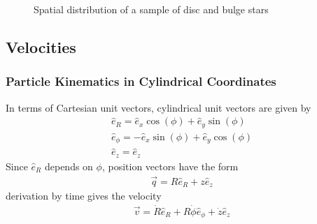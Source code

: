 \documentclass[letterpaper,10pt,english]{sphinxmanual}
\begin{document}
				\begin{figure}[htbp]
				\centering
				\capstart
				
				\noindent{}
				\caption{Spatial distribution of a sample of disc and bulge stars}\label{\detokenize{NBodySimulation/Initialization:id45}}\label{\detokenize{NBodySimulation/Initialization:fig-initial-conditions-positions}}\end{figure}
			
			
			\subsection{Velocities}
				\label{\detokenize{NBodySimulation/Initialization:velocities}}
				
				\subsubsection{Particle Kinematics in Cylindrical Coordinates}
					\label{\detokenize{NBodySimulation/Initialization:particle-kinematics-in-cylindrical-coordinates}}
					\sphinxAtStartPar
					In terms of Cartesian unit vectors, cylindrical unit vectors are given by
					\begin{equation*}
					\begin{split}\hat{e}_R = \hat{e}_x\cos(\phi) + \hat{e}_y\sin(\phi) \\
					\hat{e}_\phi = -\hat{e}_x\sin(\phi) + \hat{e}_y\cos(\phi)\\
					\hat{e}_z = \hat{e}_z\end{split}
					\end{equation*}
					\sphinxAtStartPar
					Since \(\hat{e}_R\) depends on \(\phi\), position vectors have the form
					\begin{equation*}
					\begin{split}\vec{q} = R\hat{e}_R+z\hat{e}_z\end{split}
					\end{equation*}
					\sphinxAtStartPar
					derivation by time gives the velocity
					\begin{equation}\label{equation:NBodySimulation/Initialization:cylindrical_velocity}
					\begin{split}\vec{v} = \dot{R}\hat{e}_R+R\dot{\phi}\hat{e}_\phi+\dot{z}\hat{e}_z\end{split}
					\end{equation}
				
\end{document}

